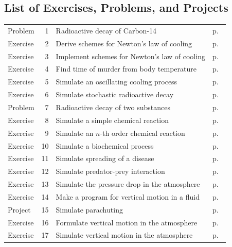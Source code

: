 \documentclass[%
oneside,                 %
final,                   %
10pt]{article}
\begin{document}
\subsection*{List of Exercises, Problems, and Projects}
\begin{tabular}{lrll}
Problem & 1 & Radioactive decay of Carbon-14 & p.~\pageref{decay:app:exer:radio:C14} \\
Exercise & 2 & Derive schemes for Newton's law of cooling & p.~\pageref{decay:app:exer:cooling:schemes} \\
Exercise & 3 & Implement schemes for Newton's law of cooling & p.~\pageref{decay:app:exer:cooling:py} \\
Exercise & 4 & Find time of murder from body temperature & p.~\pageref{decay:app:exer:cooling:murder} \\
Exercise & 5 & Simulate an oscillating cooling process & p.~\pageref{decay:app:exer:cooling:osc} \\
Exercise & 6 & Simulate stochastic radioactive decay & p.~\pageref{decay:app:exer:stoch:nuclear} \\
Problem & 7 & Radioactive decay of two substances & p.~\pageref{decay:app:exer:radio:twosubst} \\
Exercise & 8 & Simulate a simple chemical reaction & p.~\pageref{decay:app:exer:kinetics:AB} \\
Exercise & 9 & Simulate an $n$-th order chemical reaction & p.~\pageref{decay:app:exer:kinetics:ABn} \\
Exercise & 10 & Simulate a biochemical process & p.~\pageref{decay:app:exer:MMK} \\
Exercise & 11 & Simulate spreading of a disease & p.~\pageref{decay:app:exer:SIR} \\
Exercise & 12 & Simulate predator-prey interaction & p.~\pageref{decay:app:exer:predprey} \\
Exercise & 13 & Simulate the pressure drop in the atmosphere & p.~\pageref{decay:app:exer:atm1} \\
Exercise & 14 & Make a program for vertical motion in a fluid & p.~\pageref{decay:app:exer:drag:prog} \\
Project & 15 & Simulate parachuting & p.~\pageref{decay:app:exer:parachute} \\
Exercise & 16 & Formulate vertical motion in the atmosphere & p.~\pageref{decay:app:exer:drag:atm1} \\
Exercise & 17 & Simulate vertical motion in the atmosphere & p.~\pageref{decay:app:exer:drag:atm2} \\

\end{tabular}
\end{document}
